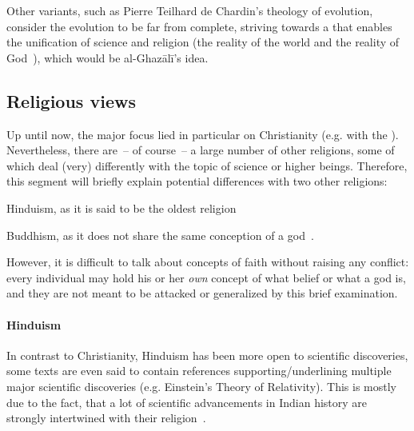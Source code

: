 Other variants, such as Pierre Teilhard de Chardin's theology of evolution, consider the evolution to be far from complete, striving towards a  that enables the unification of science and religion (the reality of the world and the reality of God~\cite{teilhard1971christianity}), which would be al-Ghazālī's idea.


\subsection{Religious views}

\label{subsec:religious-views}Up until now, the major focus lied in particular on Christianity (e.g. with the ).
Nevertheless, there are~-- of course~-- a large number of other religions, some of which deal (very) differently with the topic of science or higher beings.
Therefore, this segment will briefly explain potential differences with two other religions: \begin{inlist}
    \item Hinduism, as it is said to be the oldest religion~\cite[p.~732]{Kurien2006}
    \item Buddhism, as it does not share the same conception of a god~\cite{roloff2011buddhismus}.
\end{inlist}

However, it is difficult to talk about concepts of faith without raising any conflict: every individual may hold his or her \emph{own} concept of what belief or what a god is, and they are not meant to be attacked or generalized by this brief examination.

\paragraph{Hinduism} In contrast to Christianity, Hinduism has been more open to scientific discoveries, some texts are even said to contain references supporting/underlining multiple major scientific discoveries (e.g. Einstein's Theory of Relativity).
This is mostly due to the fact, that a lot of scientific advancements in Indian history are strongly intertwined with their religion~\cite{mitcham2005encyclopedia}.

